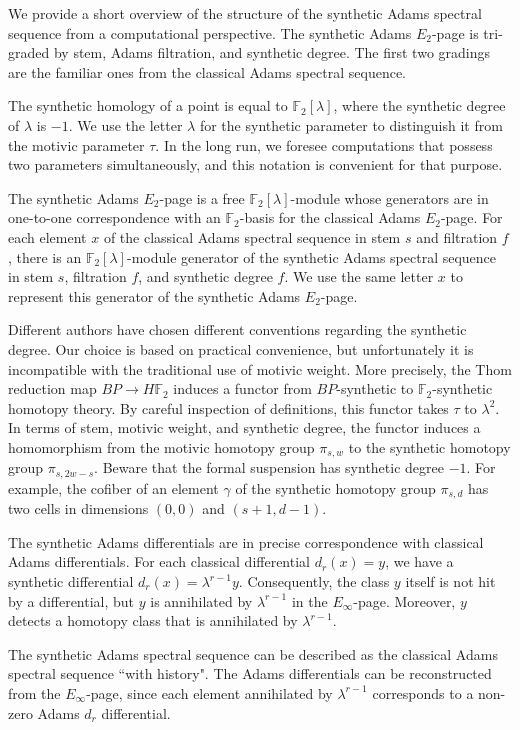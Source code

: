 \documentclass{amsart}
\theoremstyle{definition}
\newcommand{\F}{\mathbb{F}}
\newcommand{\map}{\rightarrow}
\begin{document}
We provide a short overview of the structure of the synthetic Adams spectral sequence from a computational perspective.
The synthetic Adams $E_2$-page is tri-graded by stem, Adams filtration, and synthetic degree.  The first two gradings are the familiar ones from the classical Adams spectral sequence.

The synthetic homology of a point is equal to
$\F_2[\lambda]$, where the synthetic degree of $\lambda$ is $-1$.
We use the letter $\lambda$ for the synthetic parameter to distinguish it from the motivic parameter $\tau$.  In the long run, we foresee computations that possess two parameters simultaneously, and this notation is convenient for that purpose.

The synthetic Adams $E_2$-page is a free $\F_2[\lambda]$-module whose
generators are in one-to-one correspondence with an $\F_2$-basis for
the classical Adams $E_2$-page.
For each element $x$ of the classical Adams spectral sequence in 
stem $s$ and filtration $f$, there is an $\F_2[\lambda]$-module
generator of the synthetic Adams spectral sequence in stem $s$, filtration $f$, and synthetic degree $f$.  We use the same letter $x$ to represent this generator of the synthetic Adams $E_2$-page.

Different authors have chosen different conventions regarding
the synthetic degree.  
Our choice is based on practical convenience, but unfortunately it is
incompatible with
the traditional use of motivic weight.
More precisely, the Thom reduction map $BP \map H\F_2$ induces a functor
from $BP$-synthetic to $\F_2$-synthetic homotopy theory.
By careful inspection of definitions, this functor takes
$\tau$ to $\lambda^2$.
In terms of stem, motivic weight, and synthetic degree,
the functor induces a homomorphism from the motivic 
homotopy group $\pi_{s,w}$ to the synthetic homotopy group $\pi_{s,2w-s}$.
Beware that the formal suspension has synthetic degree $-1$.  For example,
the cofiber of an element $\gamma$ of the synthetic homotopy group
$\pi_{s,d}$ has two cells in dimensions $(0,0)$ and $(s+1,d-1)$.

The synthetic Adams differentials are in precise correspondence with
classical Adams differentials.  For each classical differential
$d_r(x) = y$, we have a synthetic differential $d_r(x) = \lambda^{r-1} y$.
Consequently, the class $y$ itself is not hit by a differential,
but $y$ is annihilated by $\lambda^{r-1}$ in the $E_\infty$-page.
Moreover, $y$ detects a homotopy class that is annihilated by $\lambda^{r-1}$.

The synthetic Adams spectral sequence can be described as 
the classical Adams spectral sequence ``with history".
The Adams differentials can be reconstructed from the $E_\infty$-page,
since each element annihilated by $\lambda^{r-1}$ corresponds to
a non-zero Adams $d_r$ differential.
\end{document}
